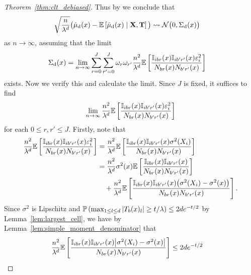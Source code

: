 \begin{proof}[Theorem~\ref{thm:clt_debiased}]
  Thus by \cite[Theorem~3.2]{hall2014martingale}
  we conclude that
  \begin{align*}
    \sqrt{\frac{n}{\lambda^d}}
    \big(
      \hat\mu_\rd(x)
      - \E\left[
        \hat\mu_\rd(x) \mid \bX, \bT
      \right]
    \big)
    &\rightsquigarrow
    \cN\big(0, \Sigma_\rd(x)\big)
  \end{align*}
  as $n \to \infty$, assuming that the limit
  \begin{align*}
    \Sigma_\rd(x)
    &=
    \lim_{n \to \infty}
    \sum_{r=0}^{J}
    \sum_{r'=0}^{J}
    \omega_r
    \omega_{r'}
    \frac{n^2}{\lambda^d}
    \E \left[
      \frac{\I_{i b r}(x) \I_{i b' r'}(x) \varepsilon_i^2}
      {N_{b r}(x) N_{b' r'}(x)}
    \right]
  \end{align*}
  exists. Now we verify this and calculate the limit.
  Since $J$ is fixed, it suffices to find
  \begin{align*}
    \lim_{n \to \infty}
    \frac{n^2}{\lambda^d}
    \E \left[
      \frac{\I_{i b r}(x) \I_{i b' r'}(x) \varepsilon_i^2}
      {N_{b r}(x) N_{b' r'}(x)}
    \right]
  \end{align*}
  for each $0 \leq r, r' \leq J$.
  Firstly, note that
  \begin{align*}
    \frac{n^2}{\lambda^d}
    \E \left[
      \frac{\I_{i b r}(x) \I_{i b' r'}(x) \varepsilon_i^2}
      {N_{b r}(x) N_{b' r'}(x)}
    \right]
    &=
    \frac{n^2}{\lambda^d}
    \E \left[
      \frac{\I_{i b r}(x) \I_{i b' r'}(x) \sigma^2(X_i)}
      {N_{b r}(x) N_{b' r'}(x)}
    \right] \\
    &=
    \frac{n^2}{\lambda^d}
    \sigma^2(x)
    \E \left[
      \frac{\I_{i b r}(x) \I_{i b' r'}(x)}
      {N_{b r}(x) N_{b' r'}(x)}
    \right] \\
    &\quad+
    \frac{n^2}{\lambda^d}
    \E \left[
      \frac{\I_{i b r}(x) \I_{i b' r'}(x)
      \big(\sigma^2(X_i) - \sigma^2(x) \big)}
      {N_{b r}(x) N_{b' r'}(x)}
    \right].
  \end{align*}
  Since $\sigma^2$ is Lipschitz and
  $\P \left(\max_{1 \leq l \leq d}
  |T_b(x)_l| \geq t/\lambda \right) \leq 2d e^{-t/2}$
  by Lemma~\ref{lem:largest_cell},
  we have by Lemma~\ref{lem:simple_moment_denominator} that
  \begin{align*}
    \frac{n^2}{\lambda^d}
    \E \left[
      \frac{\I_{i b r}(x) \I_{i b' r'}(x)
      \big|\sigma^2(X_i) - \sigma^2(x) \big|}
      {N_{b r}(x) N_{b' r'}(x)}
    \right]
    &\leq
    2de^{-t/2}

\end{align*}
\end{proof}
